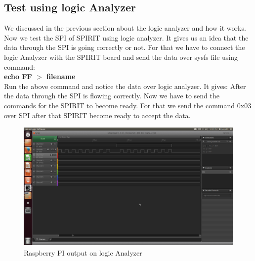 \subsection{Test using logic Analyzer}
We discussed in the previous section about the logic analyzer and how it works. Now we test the SPI of SPIRIT using logic analyzer. It gives us an idea that the data through the SPI is going correctly or not. For that we have to connect the logic Analyzer with the SPIRIT board and send the data over sysfs file using command:\\
\textbf{echo FF $>$ filename}\\
Run the above command and notice the data over logic analyzer. It gives:
After the data through the SPI is flowing correctly. Now we have to send the commands for the SPIRIT to become ready. For that we send the command 0x03 over SPI after that SPIRIT become ready to accept the data. 
\begin{figure}[H]
	\centering
	\includegraphics[width=4.5in, height=2.5in]{images/raspberryoutput.png}
	\caption{Raspberry PI output on logic Analyzer}
\end{figure}

